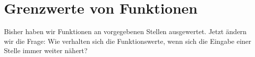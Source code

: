 \section{Grenzwerte von Funktionen}
\label{sec:real_functions_limits}
Bisher haben wir Funktionen an vorgegebenen Stellen ausgewertet.
Jetzt ändern wir die Frage: Wie verhalten sich die Funktionswerte,
wenn sich die Eingabe einer Stelle immer weiter nähert?



